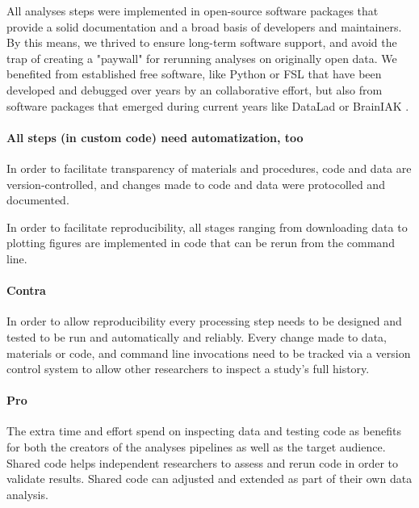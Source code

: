 All analyses steps were implemented in open-source software packages that
provide a solid documentation and a broad basis of developers and maintainers.
%
By this means, we thrived to ensure long-term software support, and avoid the
trap of creating a "paywall" for rerunning analyses on originally open data.
%
We benefited from established free software, like Python or FSL
\citep[\href{https://www.fmrib.ox.ac.uk/fsl}{FMRIB's Software
Library;}][]{smith2004fsl} that have been developed and debugged over years by
an collaborative effort,
%
but also from software packages that emerged during current years like
%
DataLad
\citep[\href{www.datalad.org}{\url{datalad.org}};][]{halchenko2021datalad} or
%
BrainIAK
\citep[\href{https://brainiak.org}{\url{brainiak.org}};][]{kumar2020brainiak,
kumar2020brainiaktutorial}.


\paragraph{All steps (in custom code) need automatization, too}

In order to facilitate transparency of materials and procedures, code and data
are version-controlled, and changes made to code and data were protocolled and
documented.

In order to facilitate reproducibility, all stages ranging from downloading data
to plotting figures are implemented in code that can be rerun from the command
line.


\paragraph{Contra}


%
In order to allow reproducibility every processing step needs to be designed and
tested to be run and automatically and reliably.
%
Every change made to data, materials or code, and command line invocations need
to be tracked via a version control system \citep[e.g.,][]{halchenko2021datalad}
to allow other researchers to inspect a study's full history.


\paragraph{Pro}


The extra time and effort spend on inspecting data and testing code as benefits
for both the creators of the analyses pipelines as well as the target audience.
%
Shared code helps independent researchers to assess and rerun code in order to
validate results.
%
Shared code can adjusted and extended  as part of their own data analysis.

